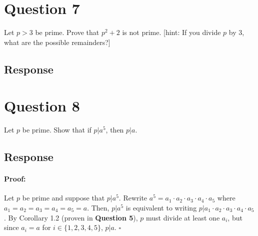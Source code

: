 \documentclass [12pt] {article}
\newcommand{\Z}{\mathbb{Z}}
\newenvironment{proof}{\paragraph{Proof:}}{\hfill$\square$}
\begin{document}

\section*{Question 7}
Let $p>3$ be prime. Prove that $p^2+2$ is not prime. [hint: If you divide $p$ by $3$, what are the possible remainders?]
\subsection*{Response}
\newpage

\section*{Question 8}
Let $p$ be prime. Show that if $p|a^5$, then $p|a$. 

\subsection*{Response}
\begin{proof}
Let $p$ be prime and suppose that $p | a^5$. Rewrite $a^5 = a_1 \cdot a_2 \cdot a_3 \cdot a_4 \cdot a_5$
where $a_1 = a_2 = a_3 = a_4 = a_5 = a$. Then, $p | a^5$ is equivalent to writing 
$p | a_1 \cdot a_2 \cdot a_3 \cdot a_4 \cdot a_5$. By Corollary 1.2 (proven in \textbf{Question 5}),
$p$ must divide at least one $a_i$, but since $a_i = a$ for $i \in \{1, 2, 3, 4, 5\}$, $p | a$.
\end{proof}
\newpage
\end{document}
